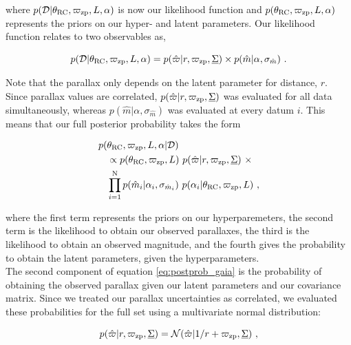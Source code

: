 \documentclass[fleqn,usenatbib]{mnras}
\newcommand{\oozp}{\mbox{$\varpi_{\rm zp}$}\xspace}
\begin{document}
\noindent where $p(\mathcal{D} | \theta_{\rm{RC}}, \varpi_{\rm{zp}}, L, \alpha)$ is now our likelihood function and $p(\theta_{\rm RC}, \varpi_{\rm zp}, L,  \alpha)$ represents the priors on our hyper- and latent parameters. Our likelihood function relates to two observables as, 

\begin{equation}\label{eq:like_gaia}
p(\mathcal{D} | \theta_{\rm{RC}}, \varpi_{\rm{zp}}, L, \alpha) = p(\hat{\varpi} | r, \oozp, \underline{\Sigma}) \times p(\hat{m} | \alpha, \sigma_{\hat{m}})\ .
\end{equation}

\noindent Note that the parallax only depends on the latent parameter for distance, $r$. Since parallax values are correlated, $p(\hat{\varpi} | r, \oozp, \underline{\Sigma})$ was evaluated for all data simultaneously, whereas $p(\hat{m} | \alpha, \sigma_{\hat{m}})$ was evaluated at every datum $i$. This means that our full posterior probability takes the form

\begin{equation}\label{eq:postprob_gaia}
\begin{split}
p(&\theta_{\rm RC}, \varpi_{\rm zp}, L, \alpha | \mathcal{D}) \\
&\propto  p(\theta_{\rm RC}, \varpi_{\rm zp}, L)\ p(\hat{\varpi} | r, \oozp, \underline{\Sigma})\ \times \\
&\prod_{i=1}^{\rm N} p(\hat{m}_i | \alpha_i, \sigma_{\hat{m}_i})\ p(\alpha_i | \theta_{\rm RC}, \varpi_{\rm zp}, L)\ ,
\end{split}
\end{equation}

\noindent where the first term represents the priors on our hyperparemeters, the second term is the likelihood to obtain our observed parallaxes, the third is the likelihood to obtain an observed magnitude, and the fourth gives the probability to obtain the latent parameters, given the hyperparameters.\\

The second component of equation \ref{eq:postprob_gaia} is the probability of obtaining the observed parallax given our latent parameters and our covariance matrix. Since we treated our parallax uncertainties as correlated, we evaluated these probabilities for the full set using a multivariate normal distribution:

\begin{equation}\label{parallax_like}
p(\hat{\varpi} | r, \oozp, \underline{\Sigma}) = \mathcal{N}(\hat{\varpi} | 1/r + \oozp , \underline{\Sigma})\ ,
\end{equation}
\end{document}
